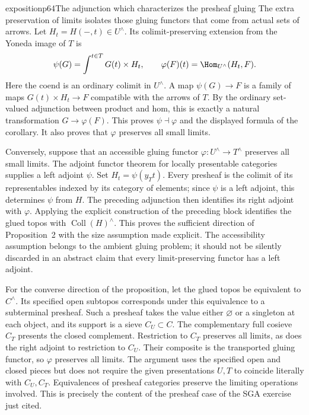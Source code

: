 \begin{dcomment}{exposition}{p64}{The adjunction which characterizes the presheaf gluing}
The extra preservation of limits isolates those gluing functors that come from actual sets of arrows. Let $H_t=H(-,t)\in U^\wedge$. Its colimit-preserving extension from the Yoneda image of $T$ is
\[
 \psi(G)=\int^{t\in T}G(t)\times H_t,
 \qquad
 \varphi(F)(t)=\Hom_{U^\wedge}(H_t,F).
\]
Here the coend is an ordinary colimit in $U^\wedge$. A map $\psi(G)\to F$ is a family of maps $G(t)\times H_t\to F$ compatible with the arrows of $T$. By the ordinary set-valued adjunction between product and hom, this is exactly a natural transformation $G\to\varphi(F)$. This proves $\psi\dashv\varphi$ and the displayed formula of the corollary. It also proves that $\varphi$ preserves all small limits.

Conversely, suppose that an accessible gluing functor $\varphi:U^\wedge\to T^\wedge$ preserves all small limits. The adjoint functor theorem for locally presentable categories supplies a left adjoint $\psi$. Set $H_t=\psi(y_Tt)$. Every presheaf is the colimit of its representables indexed by its category of elements; since $\psi$ is a left adjoint, this determines $\psi$ from $H$. The preceding adjunction then identifies its right adjoint with $\varphi$. Applying the explicit construction of the preceding block identifies the glued topos with $\operatorname{Coll}(H)^\wedge$. This proves the sufficient direction of Proposition~2 with the size assumption made explicit. The accessibility assumption belongs to the ambient gluing problem; it should not be silently discarded in an abstract claim that every limit-preserving functor has a left adjoint.

For the converse direction of the proposition, let the glued topos be equivalent to $C^\wedge$. Its specified open subtopos corresponds under this equivalence to a subterminal presheaf. Such a presheaf takes the value either $\varnothing$ or a singleton at each object, and its support is a sieve $C_U\subset C$. The complementary full cosieve $C_T$ presents the closed complement. Restriction to $C_T$ preserves all limits, as does the right adjoint to restriction to $C_U$. Their composite is the transported gluing functor, so $\varphi$ preserves all limits. The argument uses the specified open and closed pieces but does not require the given presentations $U,T$ to coincide literally with $C_U,C_T$. Equivalences of presheaf categories preserve the limiting operations involved. This is precisely the content of the presheaf case of the SGA exercise just cited.


\end{dcomment}
